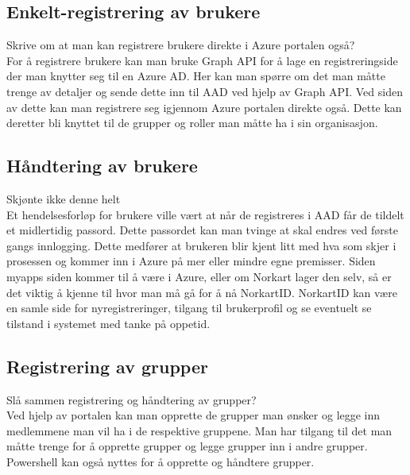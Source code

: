 \subsection{Enkelt-registrering av brukere}
\label{subsec:konfigurasjon_handteringAvRollerOgGrupper_enkeltRegistrering}
{\color{blue} Skrive om at man kan registrere brukere direkte i Azure portalen også?}\\
For å registrere brukere kan man bruke Graph API for å lage en registreringside der man knytter seg til en Azure AD. Her kan man spørre om det man måtte trenge av detaljer og sende dette inn til AAD ved hjelp av Graph API. Ved siden av dette kan man registrere seg igjennom Azure portalen direkte også. Dette kan deretter bli knyttet til de grupper og roller man måtte ha i sin organisasjon.

\subsection{Håndtering av brukere}
\label{subsec::konfigurasjon_handteringAvRollerOgGrupper_haandteringAvBrukere}
{\color{blue} Skjønte ikke denne helt}\\
Et hendelsesforløp for brukere ville vært at når de registreres i AAD får de tildelt et midlertidig passord. Dette passordet kan man tvinge at skal endres ved første gangs innlogging. Dette medfører at brukeren blir kjent litt med hva som skjer i prosessen og kommer inn i Azure på mer eller mindre egne premisser. Siden myapps siden kommer til å være i Azure, eller om Norkart lager den selv, så er det viktig å kjenne til hvor man må gå for å nå NorkartID. NorkartID kan være en samle side for nyregistreringer, tilgang til brukerprofil og se eventuelt se tilstand i systemet med tanke på oppetid.

\subsection{Registrering av grupper}
\label{subsec::konfigurasjon_handteringAvRollerOgGrupper_grupper}
{\color{blue}Slå sammen registrering og håndtering av grupper?}\\
Ved hjelp av portalen kan man opprette de grupper man ønsker og legge inn medlemmene man vil ha i de respektive gruppene. Man har tilgang til det man måtte trenge for å opprette grupper og legge grupper inn i andre grupper. 
Powershell kan også nyttes for å opprette og håndtere grupper. 

